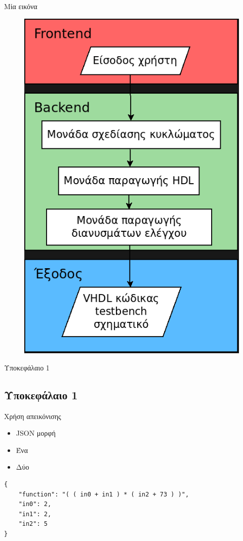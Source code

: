 \documentclass[12pt,t,aspectratio=169,xcolor=table]{beamer}
\begin{document}
\begin{frame}{Μία εικόνα}

	\begin{figure}[h!]
	\vspace*{-1em}
		\includegraphics[scale=0.25]{tool_outline}
	\end{figure}
\end{frame}

\begin{frame}[plain,c]
\begin{center}
\Huge Υποκεφάλαιο 1
\end{center}
\end{frame}

\subsection{Υποκεφάλαιο 1}
\begin{frame}[fragile]{Χρήση απεικόνισης}
\begin{itemize}
  \setlength\itemsep{0.15cm}
  \item JSON μορφή
  \item Ένα
  \item Δύο
\end{itemize}
\bigskip
\begin{lstlisting}
{
	"function": "( ( in0 + in1 ) * ( in2 + 73 ) )",
	"in0": 2,
	"in1": 2,
	"in2": 5
}
\end{lstlisting}
\end{frame}
\end{document}
